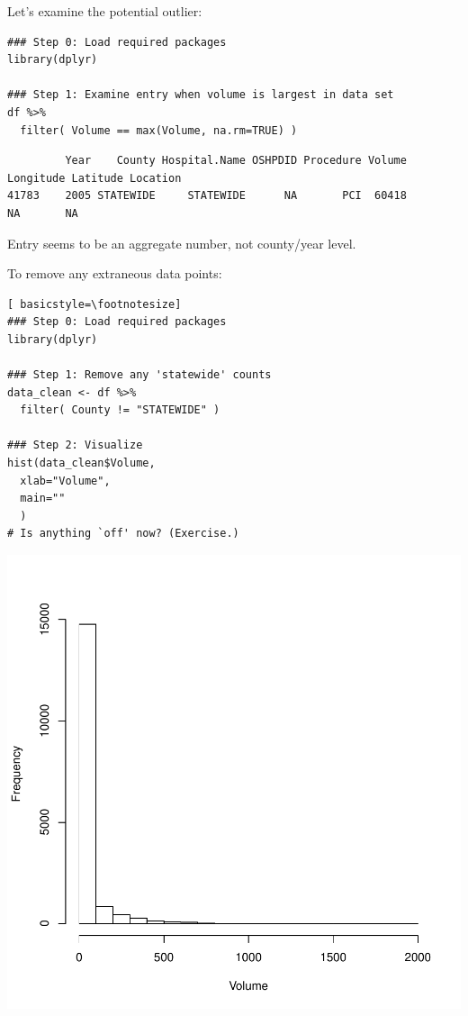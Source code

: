 \begin{frame}
Let's examine the potential outlier:
  \begin{lstlisting}
### Step 0: Load required packages
library(dplyr)

### Step 1: Examine entry when volume is largest in data set
df %>%
  filter( Volume == max(Volume, na.rm=TRUE) )

  \end{lstlisting}
{ \tiny
\begin{verbatim}
         Year    County Hospital.Name OSHPDID Procedure Volume Longitude Latitude Location
41783    2005 STATEWIDE     STATEWIDE      NA       PCI  60418        NA       NA         
\end{verbatim}
}

Entry seems to be an aggregate number, not county/year level.  
\newpage

To remove any extraneous data points:
  \begin{lstlisting}[ basicstyle=\footnotesize]
### Step 0: Load required packages
library(dplyr)

### Step 1: Remove any 'statewide' counts
data_clean <- df %>%
  filter( County != "STATEWIDE" )

### Step 2: Visualize
hist(data_clean$Volume,
  xlab="Volume",
  main=""
  )
# Is anything `off' now? (Exercise.)
  \end{lstlisting}

\newpage
    \begin{center}
       \includegraphics[scale=0.42]{images/histogram2.pdf}
    \end{center}   

\end{frame}

